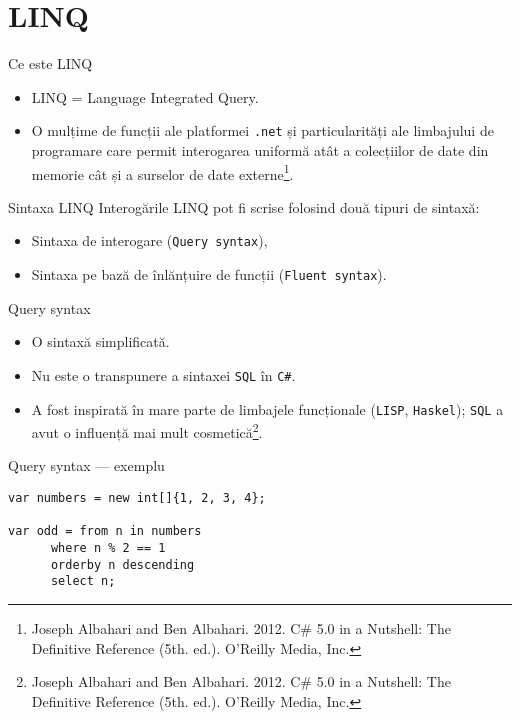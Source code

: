 \documentclass[presentation]{beamer}
\begin{document}
\section{LINQ}
\label{sec:org4ada9d6}
\begin{frame}[label={sec:org2203325},fragile]{Ce este LINQ}
 \begin{itemize}
\item LINQ = Language Integrated Query.
\item O mulțime de funcții ale platformei \texttt{.net} și particularități ale limbajului de programare care permit interogarea uniformă atât a colecțiilor de date din memorie cât și a surselor de date externe\footnote{Joseph Albahari and Ben Albahari. 2012. C\# 5.0 in a Nutshell: The Definitive Reference (5th. ed.). O’Reilly Media, Inc.\label{org2794c32}}.
\end{itemize}
\end{frame}
\begin{frame}[label={sec:org17e0b7f},fragile]{Sintaxa LINQ}
 Interogările LINQ pot fi scrise folosind două tipuri de sintaxă:
\begin{itemize}
\item Sintaxa de interogare (\texttt{Query syntax}),
\item Sintaxa pe bază de înlănțuire de funcții (\texttt{Fluent syntax}).
\end{itemize}
\end{frame}
\begin{frame}[label={sec:org68d9613},fragile]{Query syntax}
 \begin{itemize}
\item O sintaxă simplificată.
\item \alert{Nu} este o transpunere a sintaxei \texttt{SQL} în \texttt{C\#}.
\item A fost inspirată în mare parte de limbajele funcționale (\texttt{LISP}, \texttt{Haskel}); \texttt{SQL} a avut o influență mai mult cosmetică\footnote{Joseph Albahari and Ben Albahari. 2012. C\# 5.0 in a Nutshell: The Definitive Reference (5th. ed.). O’Reilly Media, Inc.}.
\end{itemize}
\end{frame}
\begin{frame}[label={sec:org91b947c},fragile]{Query syntax --- exemplu}
 \begin{verbatim}
var numbers = new int[]{1, 2, 3, 4};

var odd = from n in numbers
	  where n % 2 == 1
	  orderby n descending
	  select n;
\end{verbatim}
\end{frame}
\end{document}
